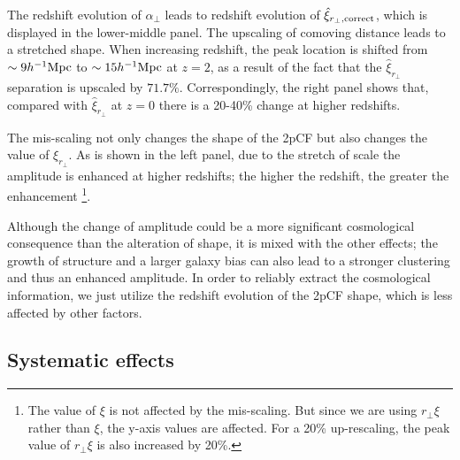 \documentclass[iop]{emulateapj}
\begin{document}
The redshift evolution of $\alpha_{\perp}$ leads to redshift evolution of 
$\hat \xi_{r_\perp, \rm correct}$,
which is displayed in the lower-middle panel.
The upscaling of comoving distance leads to a stretched shape.
When increasing redshift,
the peak location is shifted from $\sim9h^{-1} \rm Mpc$ to $\sim15 h^{-1}\rm Mpc$ at $z=2$,
as a result of the fact that the $\hat\xi_{r_{\perp}}$ separation is upscaled by $71.7\%$.
Correspondingly, the right panel shows that, 
compared with $\hat \xi_{r_\perp}$ at $z=0$ there is a 20-40\% change at higher redshifts.

The mis-scaling not only changes the shape of the 2pCF but also changes the value of $ \xi_{r_\perp}$. %
As is shown in the left panel, due to the stretch of scale the amplitude is enhanced at higher redshifts;
the higher the redshift, the greater the enhancement
\footnote{The value of $\xi$ is not affected by the mis-scaling. 
But since we are using $r_\perp\xi$ rather than $\xi$, the y-axis values are affected. 
For a 20\% up-rescaling, the peak value of $r_\perp\xi$ is also increased by 20\%.}.%

Although the change of amplitude could be a more significant cosmological consequence 
than the alteration of shape,
it is mixed with the other effects; 
the growth of structure and a larger galaxy bias can also lead to a stronger clustering and thus an enhanced amplitude.
In order to reliably extract the cosmological information, 
we just utilize the redshift evolution of the 2pCF shape, 
which is less affected by other factors.


\subsection{Systematic effects}
\end{document}
